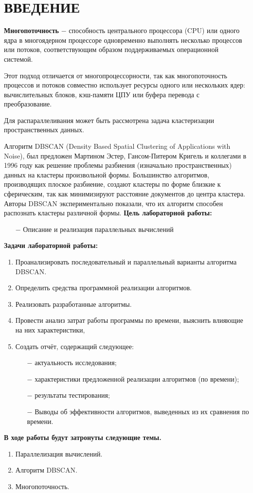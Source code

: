 \chapter*{ВВЕДЕНИЕ}

\textbf{Многопоточность} $-$ способность центрального процессора (CPU) или одного ядра в многоядерном процессоре одновременно выполнять несколько процессов или потоков, соответствующим образом поддерживаемых операционной системой.

Этот подход отличается от многопроцессорности, так как многопоточность процессов и потоков совместно использует ресурсы одного или нескольких ядер: вычислительных блоков, кэш-памяти ЦПУ или буфера перевода с преобразование.

Для распараллеливания может быть рассмотрена задача кластеризации пространственных данных. 

Алгоритм DBSCAN (Density Based Spatial Clustering of Applications with Noise), был предложен Мартином Эстер, Гансом-Питером Кригель и коллегами в 1996 году как решение проблемы разбиения (изначально пространственных) данных на кластеры произвольной формы. 
Большинство алгоритмов, производящих плоское разбиение, создают кластеры по форме близкие к сферическим, так как минимизируют расстояние документов до центра кластера.
Авторы DBSCAN экспериментально показали, что их алгоритм способен распознать кластеры различной формы.
\clearpage
\textbf{Цель лабораторной работы:}
\begin{itemize}
    \item[$-$] Описание и реализация параллельных вычислений
\end{itemize}

\textbf{Задачи лабораторной работы:}
\begin{enumerate}
    \item Проанализировать последовательный и параллельный варианты алгоритма DBSCAN.
    \item Определить средства программной реализации алгоритмов.
    \item Реализовать разработанные алгоритмы.
    \item Провести анализ затрат работы программы по времени, выяснить влияющие на них характеристики,
    \item Создать отчёт, содержащий следующее:
    \begin{enumerate}
        \item[$-$] актуальность исследования;
        \item[$-$] характеристики предложенной реализации алгоритмов (по времени);
        \item[$-$] результаты тестирования;
        \item[$-$] Выводы об эффективности алгоритмов, выведенных из их сравнения по времени.
    \end{enumerate}
\end{enumerate}

\textbf{В ходе работы будут затронуты следующие темы.}
\begin{enumerate}
\item Параллелизация вычислений.
\item Алгоритм DBSCAN.
\item Многопоточность.
\end{enumerate}
